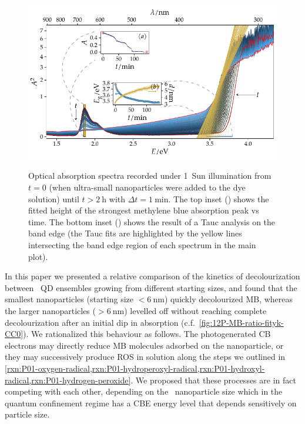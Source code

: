 \documentclass[draft,webedition,openright,titles,swedish,english]{LuaUUThesis}\usepackage[]{graphicx}\usepackage[]{xcolor}
\newenvironment{knitrout}{}{} %
\newcommand{\cf}{c.f.}
\begin{document}
\begin{figure}[tbp]
\centering
\begin{knitrout}\scriptsize
{}\color{fgcolor}

{\centering \includegraphics[width=4.72in]{figure/0512P-fig-MB-N04H-small-nostir-photodegradation-1} 

}


\end{knitrout}
{\label{fig-a:P12-MB-N04H-small-nostir-photodegradation}}
{\label{fig-b:P12-MB-N04H-small-nostir-photodegradation}}
\caption[Photocatalytic degradation of MB with \ZnO\ QDs]{%
   Optical absorption spectra recorded under 1~Sun illumination from $t=0$
   (when ultra-small  nanoparticles were added to the  dye solution)
   until $t>\qty{2}{\hour}$ with $\Delta t=\qty{1}{\minute}$.
   The top inset () shows
   the fitted height of the strongest methylene blue absorption peak vs time.
   The bottom inset () shows
   the result of a Tauc analysis on the band edge (the Tauc fits are highlighted by
   the yellow lines intersecting the band edge region of each spectrum in the main plot).}
\label{fig:P12-MB-N04H-small-nostir-photodegradation}
\end{figure}

In this paper we presented a relative comparison of the kinetics of decolourization
between \ZnO\ \gls{QD} ensembles growing from different starting sizes, and found
that the smallest nanoparticles (starting size $<\qty{6}{\nm}$) quickly
decolourized \gls{MB}, whereas the larger nanoparticles ($>\qty{6}{\nm}$)
levelled off without reaching complete decolourization after an initial dip
in absorption (\cf\ \cref{fig:12P-MB-ratio-fityk-CC0}).
We rationalized this behaviour as follows.
The photogenerated \gls{CB} electrons may directly reduce \gls{MB} molecules
adsorbed on the nanoparticle, or they may successively produce \gls{ROS} in solution
along the steps we outlined
in \cref{rxn:P01-oxygen-radical,rxn:P01-hydroperoxyl-radical,rxn:P01-hydroxyl-radical,rxn:P01-hydrogen-peroxide}.
We proposed that these processes are in fact competing with each other, depending
on the \ZnO\ nanoparticle size which in the quantum confinement regime has a
\gls{CBE} energy level that depends sensitively on particle size.
\end{document}
